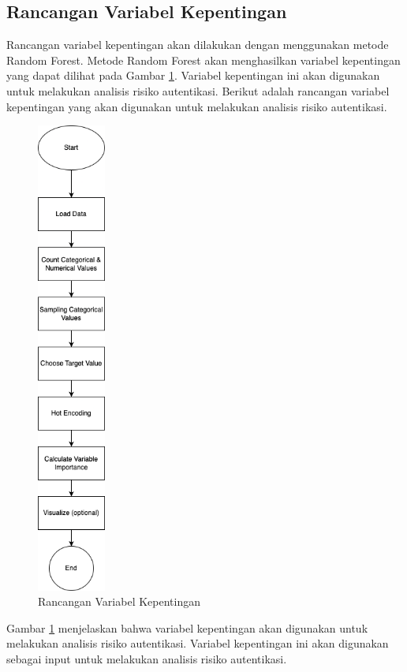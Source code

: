 \subsection{Rancangan Variabel Kepentingan}
Rancangan variabel kepentingan akan dilakukan dengan menggunakan metode Random Forest. Metode Random Forest akan menghasilkan variabel kepentingan yang dapat dilihat pada Gambar \ref{fig:variabel-kepentingan}. Variabel kepentingan ini akan digunakan untuk melakukan analisis risiko autentikasi.
Berikut adalah rancangan variabel kepentingan yang akan digunakan untuk melakukan analisis risiko autentikasi.
\begin{figure}[H]
    \centering
    \includegraphics[width=0.2\textwidth]{contents/chapter-4/vim.drawio.png}
    \caption{Rancangan Variabel Kepentingan}
    \label{fig:variabel-kepentingan}
\end{figure}

Gambar \ref{fig:variabel-kepentingan} menjelaskan bahwa variabel kepentingan akan digunakan untuk melakukan analisis risiko autentikasi. Variabel kepentingan ini akan digunakan sebagai input untuk melakukan analisis risiko autentikasi.

